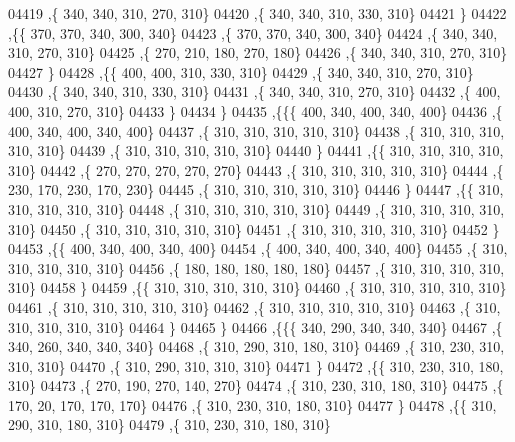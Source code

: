 \begin{DoxyCode}
04419     ,\{   340,   340,   310,   270,   310\}
04420     ,\{   340,   340,   310,   330,   310\}
04421     \}
04422    ,\{\{   370,   370,   340,   300,   340\}
04423     ,\{   370,   370,   340,   300,   340\}
04424     ,\{   340,   340,   310,   270,   310\}
04425     ,\{   270,   210,   180,   270,   180\}
04426     ,\{   340,   340,   310,   270,   310\}
04427     \}
04428    ,\{\{   400,   400,   310,   330,   310\}
04429     ,\{   340,   340,   310,   270,   310\}
04430     ,\{   340,   340,   310,   330,   310\}
04431     ,\{   340,   340,   310,   270,   310\}
04432     ,\{   400,   400,   310,   270,   310\}
04433     \}
04434    \}
04435   ,\{\{\{   400,   340,   400,   340,   400\}
04436     ,\{   400,   340,   400,   340,   400\}
04437     ,\{   310,   310,   310,   310,   310\}
04438     ,\{   310,   310,   310,   310,   310\}
04439     ,\{   310,   310,   310,   310,   310\}
04440     \}
04441    ,\{\{   310,   310,   310,   310,   310\}
04442     ,\{   270,   270,   270,   270,   270\}
04443     ,\{   310,   310,   310,   310,   310\}
04444     ,\{   230,   170,   230,   170,   230\}
04445     ,\{   310,   310,   310,   310,   310\}
04446     \}
04447    ,\{\{   310,   310,   310,   310,   310\}
04448     ,\{   310,   310,   310,   310,   310\}
04449     ,\{   310,   310,   310,   310,   310\}
04450     ,\{   310,   310,   310,   310,   310\}
04451     ,\{   310,   310,   310,   310,   310\}
04452     \}
04453    ,\{\{   400,   340,   400,   340,   400\}
04454     ,\{   400,   340,   400,   340,   400\}
04455     ,\{   310,   310,   310,   310,   310\}
04456     ,\{   180,   180,   180,   180,   180\}
04457     ,\{   310,   310,   310,   310,   310\}
04458     \}
04459    ,\{\{   310,   310,   310,   310,   310\}
04460     ,\{   310,   310,   310,   310,   310\}
04461     ,\{   310,   310,   310,   310,   310\}
04462     ,\{   310,   310,   310,   310,   310\}
04463     ,\{   310,   310,   310,   310,   310\}
04464     \}
04465    \}
04466   ,\{\{\{   340,   290,   340,   340,   340\}
04467     ,\{   340,   260,   340,   340,   340\}
04468     ,\{   310,   290,   310,   180,   310\}
04469     ,\{   310,   230,   310,   310,   310\}
04470     ,\{   310,   290,   310,   310,   310\}
04471     \}
04472    ,\{\{   310,   230,   310,   180,   310\}
04473     ,\{   270,   190,   270,   140,   270\}
04474     ,\{   310,   230,   310,   180,   310\}
04475     ,\{   170,    20,   170,   170,   170\}
04476     ,\{   310,   230,   310,   180,   310\}
04477     \}
04478    ,\{\{   310,   290,   310,   180,   310\}
04479     ,\{   310,   230,   310,   180,   310\}

\end{DoxyCode}
